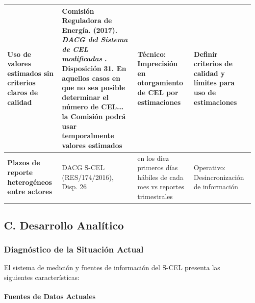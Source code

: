 \documentclass{cel}
\begin{document}
\begin{tabladoradoLargo}
\begin{xltabular}{\textwidth}{|X|X|X|X|}
\textbf{Uso de valores estimados sin criterios claros de calidad} & Comisión Reguladora de Energía. (2017). \textit{DACG del Sistema de CEL modificadas} . Disposición 31. \textquotedbl{}En aquellos casos en que no sea posible determinar el número de CEL... la Comisión podrá usar temporalmente valores estimados\textquotedbl{} & Técnico: Imprecisión en otorgamiento de CEL por estimaciones & Definir criterios de calidad y límites para uso de estimaciones \\ \hline
\textbf{Plazos de reporte heterogéneos entre actores} & DACG S-CEL (RES/174/2016), Disp. 26 & \textquotedbl{}en los diez primeros días hábiles de cada mes\textquotedbl{} vs reportes trimestrales & Operativo: Desincronización de información \\ \hline
\bottomrule
\end{xltabular}
\end{tabladoradoLargo}


\subsection{C. Desarrollo Analítico}
\nopagebreak

\subsubsection{Diagnóstico de la Situación Actual}
\nopagebreak

El sistema de medición y fuentes de información del S-CEL presenta las siguientes características:


\paragraph{Fuentes de Datos Actuales}
\nopagebreak
\end{document}
